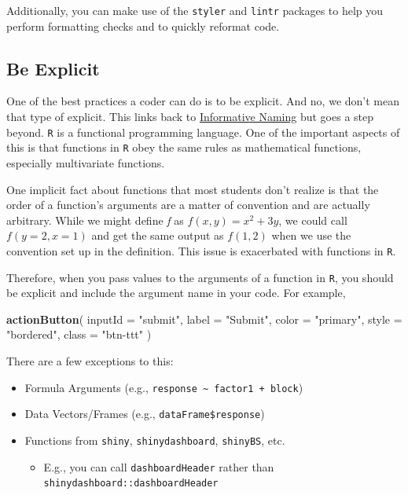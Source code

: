 \documentclass[
]{book}
\newenvironment{Shaded}{\begin{snugshade}}{\end{snugshade}}
\newcommand{\DataTypeTok}[1]{\textcolor[rgb]{0.13,0.29,0.53}{#1}}
\newcommand{\KeywordTok}[1]{\textcolor[rgb]{0.13,0.29,0.53}{\textbf{#1}}}
\newcommand{\NormalTok}[1]{#1}
\newcommand{\StringTok}[1]{\textcolor[rgb]{0.31,0.60,0.02}{#1}}
\providecommand{\tightlist}{%
  \setlength{\itemsep}{0pt}\setlength{\parskip}{0pt}}
\begin{document}
Additionally, you can make use of the \texttt{styler} and \texttt{lintr} packages to help you perform formatting checks and to quickly reformat code.

\hypertarget{explicitc}{%
\subsection{Be Explicit}\label{explicitc}}

One of the best practices a coder can do is to be explicit. And no, we don't mean that type of explicit. This links back to \protect\hyperlink{naming}{Informative Naming} but goes a step beyond. \texttt{R} is a functional programming language. One of the important aspects of this is that functions in \texttt{R} obey the same rules as mathematical functions, especially multivariate functions.

One implicit fact about functions that most students don't realize is that the order of a function's arguments are a matter of convention and are actually arbitrary. While we might define \emph{f} as \(f(x,y) = x^2+3y\), we could call \(f(y=2,x=1)\) and get the same output as \(f(1,2)\) when we use the convention set up in the definition. This issue is exacerbated with functions in \texttt{R}.

Therefore, when you pass values to the arguments of a function in \texttt{R}, you should be explicit and include the argument name in your code. For example,

\begin{Shaded}
\begin{Highlighting}[]
\KeywordTok{actionButton}\NormalTok{(}
  \DataTypeTok{inputId =} \StringTok{"submit"}\NormalTok{,}
  \DataTypeTok{label =} \StringTok{"Submit"}\NormalTok{,}
  \DataTypeTok{color =} \StringTok{"primary"}\NormalTok{,}
  \DataTypeTok{style =} \StringTok{"bordered"}\NormalTok{,}
  \DataTypeTok{class =} \StringTok{"btn-ttt"}
\NormalTok{)}
\end{Highlighting}
\end{Shaded}

There are a few exceptions to this:

\begin{itemize}
\tightlist
\item
  Formula Arguments (e.g., \texttt{response\ \textasciitilde{}\ factor1\ +\ block})
\item
  Data Vectors/Frames (e.g., \texttt{dataFrame\$response})
\item
  Functions from \texttt{shiny}, \texttt{shinydashboard}, \texttt{shinyBS}, etc.

  \begin{itemize}
  \tightlist
  \item
    E.g., you can call \texttt{dashboardHeader} rather than \texttt{shinydashboard::dashboardHeader}
  \end{itemize}
\end{itemize}
\end{document}
